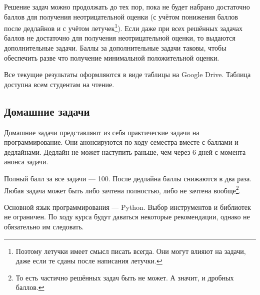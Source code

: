Решение задач можно продолжать до тех пор, пока не будет набрано достаточно баллов для получения неотрицательной оценки (с учётом понижения баллов после дедлайнов и с учётом летучек\footnote{Поэтому летучки имеет смысл писать всегда. Они могут влияют на задачи, даже если те сданы после написания летучки.}). 
Если даже при всех решённых задачах баллов не достаточно для получения неотрицательной оценки, то выдаются дополнительные задачи. 
Баллы за дополнительные задачи таковы, чтобы обеспечить разве что получение минимальной положительной оценки. 

Все текущие результаты оформляются в виде таблицы на Google Drive.
Таблица доступна всем студентам на чтение.

\subsection{Домашние задачи}

Домашние задачи представляют из себя практические задачи на программирование.
Они анонсируются по ходу семестра вместе с баллами и дедлайнами.
Дедлайн не может наступить раньше, чем через 6 дней с момента анонса задачи.

Полный балл за все задачи --- 100. После дедлайна баллы снижаются в два раза. Любая задача может быть либо зачтена полностью, либо не зачтена вообще\footnote{То есть частично решённых задач быть не может. А значит, и дробных баллов.}.

Основной язык программирования --- Python. Выбор инструментов и библиотек не ограничен. По ходу курса будут даваться некоторые рекомендации, однако не обязательно им следовать.

